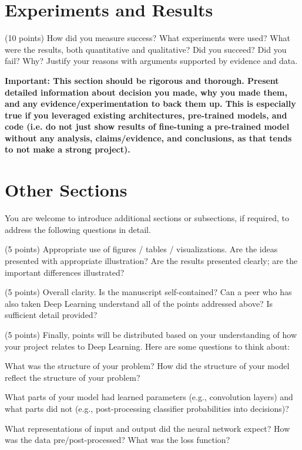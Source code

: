 \documentclass[10pt,twocolumn,letterpaper]{article}
\begin{document}
\section{Experiments and Results}

(10 points) How did you measure success? What experiments were used? What were the results, both quantitative and qualitative? Did you succeed? Did you fail? Why? Justify your reasons with arguments supported by evidence and data.

\textbf{Important: This section should be rigorous and thorough. Present detailed information about decision you made, why you made them, and any evidence/experimentation to back them up. This is especially true if you leveraged existing architectures, pre-trained models, and code (i.e. do not just show results of fine-tuning a pre-trained model without any analysis, claims/evidence, and conclusions, as that tends to not make a strong project). }

\section{Other Sections}


You are welcome to introduce additional sections or subsections, if required, to address the following questions in detail. 

(5 points) Appropriate use of figures / tables / visualizations. Are the ideas presented with appropriate illustration? Are the results presented clearly; are the important differences illustrated? 

(5 points) Overall clarity. Is the manuscript self-contained? Can a peer who has also taken Deep Learning understand all of the points addressed above? Is sufficient detail provided? 

(5 points) Finally, points will be distributed based on your understanding of how your project relates to Deep Learning. Here are some questions to think about: 

What was the structure of your problem? How did the structure of your model reflect the structure of your problem? 

What parts of your model had learned parameters (e.g., convolution layers) and what parts did not (e.g., post-processing classifier probabilities into decisions)? 

What representations of input and output did the neural network expect? How was the data pre/post-processed?
What was the loss function? 
\end{document}
